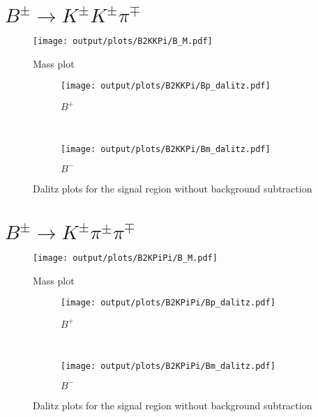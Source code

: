 \documentclass[12pt,a4paper]{article}
\begin{document}
\FloatBarrier


\clearpage
\section{$B^\pm \rightarrow K^\pm K^\pm \pi^\mp$}
\FloatBarrier

\begin{figure}[ht]
  \centering
  \texttt{[image: output/plots/B2KKPi/B\_M.pdf]}
  \caption{Mass plot}
\end{figure}

\begin{figure}[ht]
  \centering
  \begin{subfigure}[t]{0.5\textwidth}
    \centering
    \texttt{[image: output/plots/B2KKPi/Bp\_dalitz.pdf]}
    \caption{$B^+$}
  \end{subfigure}%
  ~
  \begin{subfigure}[t]{0.5\textwidth}
    \centering
    \texttt{[image: output/plots/B2KKPi/Bm\_dalitz.pdf]}
    \caption{$B^-$}
  \end{subfigure}%
  \caption{Dalitz plots for the signal region without background subtraction}
\end{figure}

\FloatBarrier



\clearpage
\section{$B^\pm \rightarrow K^\pm \pi^\pm \pi^\mp$}
\FloatBarrier

\begin{figure}[ht]
  \centering
  \texttt{[image: output/plots/B2KPiPi/B\_M.pdf]}
  \caption{Mass plot}
\end{figure}

\begin{figure}[ht]
  \centering
  \begin{subfigure}[t]{0.5\textwidth}
    \centering
    \texttt{[image: output/plots/B2KPiPi/Bp\_dalitz.pdf]}
    \caption{$B^+$}
  \end{subfigure}%
  ~
  \begin{subfigure}[t]{0.5\textwidth}
    \centering
    \texttt{[image: output/plots/B2KPiPi/Bm\_dalitz.pdf]}
    \caption{$B^-$}
  \end{subfigure}%
  \caption{Dalitz plots for the signal region without background subtraction}
\end{figure}
\end{document}
